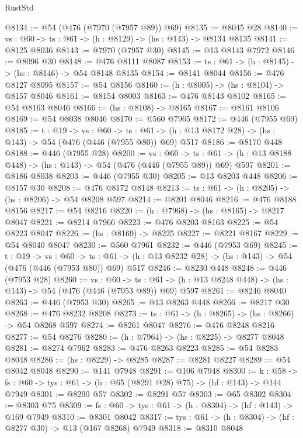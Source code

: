 \begin{lexlean}{RustStd}
\begin{coremodule}
@8134 := @54 (@476 (@7970 (@7957 @89)) @69)
@8135 := @8045 @28
@8140 := {vs : @60} -> {ts : @61} -> (h : @8129) -> (hs : @143) -> @8134 @8135
@8141 := @8125 @8036
@8143 := @7970 (@7957 @30)
@8145 := @13 @8143 @7972
@8146 := @8096 @30
@8148 := @476 @8111 @8087
@8153 := {ts : @61} -> (h : @8145) -> (hs : @8146) -> @54 @8148 @8135
@8154 := @8141 @8044
@8156 := @476 @8127 @8095
@8157 := @54 @8156
@8160 := (h : @8005) -> (hs : @8104) -> @8157 @8046
@8161 := @8154 @8003
@8163 := @476 @8143 @8102
@8165 := @54 @8163 @8046
@8166 := (hs : @8108) -> @8165
@8167 := @8161 @8106
@8169 := @54 @8038 @8046
@8170 := @560 @7965
@8172 := @446 (@7955 @69)
@8185 := {t : @19} ->
  {vs : @60} ->
  {ts : @61} -> (h : @13 @8172 @28) -> (hs : @143) -> @54 (@476 (@446 (@7955 @80)) @69) @517
@8186 := @8170 @448
@8188 := @446 (@7955 @28)
@8200 := {vs : @60} ->
  {ts : @61} -> (h : @13 @8188 @448) -> (hs : @143) -> @54 (@476 (@446 (@7955 @89)) @69) @597
@8201 := @8186 @8038
@8203 := @446 (@7955 @30)
@8205 := @13 @8203 @448
@8206 := @8157 @30
@8208 := @476 @8172 @8148
@8213 := {ts : @61} -> (h : @8205) -> (hs : @8206) -> @54 @8208 @597
@8214 := @8201 @8046
@8216 := @476 @8188 @8156
@8217 := @54 @8216
@8220 := (h : @7968) -> (hs : @8165) -> @8217 @8047
@8221 := @8214 @7966
@8223 := @476 @8203 @8163
@8225 := @54 @8223 @8047
@8226 := (hs : @8169) -> @8225
@8227 := @8221 @8167
@8229 := @54 @8040 @8047
@8230 := @560 @7961
@8232 := @446 (@7953 @69)
@8245 := {t : @19} ->
  {vs : @60} ->
  {ts : @61} -> (h : @13 @8232 @28) -> (hs : @143) -> @54 (@476 (@446 (@7953 @80)) @69) @517
@8246 := @8230 @448
@8248 := @446 (@7953 @28)
@8260 := {vs : @60} ->
  {ts : @61} -> (h : @13 @8248 @448) -> (hs : @143) -> @54 (@476 (@446 (@7953 @89)) @69) @597
@8261 := @8246 @8040
@8263 := @446 (@7953 @30)
@8265 := @13 @8263 @448
@8266 := @8217 @30
@8268 := @476 @8232 @8208
@8273 := {ts : @61} -> (h : @8265) -> (hs : @8266) -> @54 @8268 @597
@8274 := @8261 @8047
@8276 := @476 @8248 @8216
@8277 := @54 @8276
@8280 := (h : @7964) -> (hs : @8225) -> @8277 @8048
@8281 := @8274 @7962
@8283 := @476 @8263 @8223
@8285 := @54 @8283 @8048
@8286 := (hs : @8229) -> @8285
@8287 := @8281 @8227
@8289 := @54 @8042 @8048
@8290 := @141 @7948
@8291 := @106 @7948
@8300 := {k : @58} ->
  {fs : @60} -> {tys : @61} -> (h : @65 (@8291 @28) @75) -> (hf : @143) -> @144 @7949
@8301 := @8290 @57
@8302 := @8291 @57
@8303 := @65 @8302
@8304 := @8303 @75
@8309 := {fs : @60} -> {tys : @61} -> (h : @8304) -> (hf : @143) -> @169 @7949
@8310 := @8301 @8042
@8317 := {tys : @61} -> (h : @8304) -> (hf : @8277 @30) -> @13 (@167 @8268) @7949
@8318 := @8310 @8048

\end{coremodule}
\end{lexlean}

